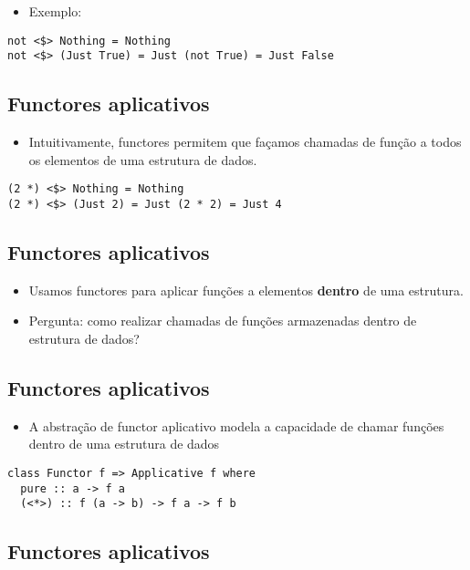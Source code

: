 \documentclass[11pt]{article}
\begin{document}
\begin{itemize}
\item Exemplo:
\end{itemize}

\begin{verbatim}
not <$> Nothing = Nothing
not <$> (Just True) = Just (not True) = Just False
\end{verbatim}
\subsection*{Functores aplicativos}
\label{sec:org036ae7c}

\begin{itemize}
\item Intuitivamente, functores permitem que façamos chamadas de função a
todos os elementos de uma estrutura de dados.
\end{itemize}

\begin{verbatim}
(2 *) <$> Nothing = Nothing
(2 *) <$> (Just 2) = Just (2 * 2) = Just 4
\end{verbatim}
\subsection*{Functores aplicativos}
\label{sec:org0b2afd6}

\begin{itemize}
\item Usamos functores para aplicar funções a elementos \textbf{dentro} de uma estrutura.

\item Pergunta: como realizar chamadas de funções armazenadas dentro de estrutura de dados?
\end{itemize}
\subsection*{Functores aplicativos}
\label{sec:org4fb5c2d}

\begin{itemize}
\item A abstração de functor aplicativo modela a capacidade de chamar funções dentro de uma estrutura de dados
\end{itemize}

\begin{verbatim}
class Functor f => Applicative f where
  pure :: a -> f a
  (<*>) :: f (a -> b) -> f a -> f b
\end{verbatim}
\subsection*{Functores aplicativos}
\label{sec:org64642dd}
\end{document}
